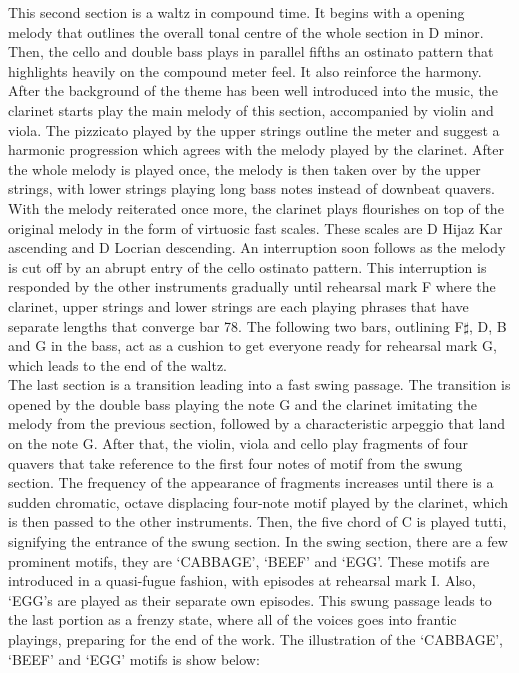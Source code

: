 \documentclass{article}
\begin{document}
This second section is a waltz in compound time. It begins with a opening
melody that outlines the overall tonal centre of the whole section in D minor.
Then, the cello
and double bass plays in parallel fifths an ostinato pattern that highlights
heavily on the compound meter feel. It also reinforce the harmony. After the
background of the theme has been well introduced into the music, the clarinet
starts play the main melody of this section, accompanied by violin and viola.
The pizzicato played by the upper strings outline the meter and suggest a
harmonic progression which agrees with the melody played by the clarinet. After
the whole melody is played once, the melody is then taken over by the upper
strings, with lower strings playing long bass notes instead of downbeat
quavers. With the melody reiterated once more, the clarinet plays flourishes on
top of the original melody in the form of virtuosic fast scales. These scales
are D Hijaz Kar ascending and D Locrian descending. An interruption soon
follows as the melody is cut off by an abrupt entry of the cello ostinato
pattern. This interruption is responded by the other instruments gradually
until rehearsal mark F where the clarinet, upper strings and lower strings are
each playing phrases that have separate lengths that converge bar 78. The
following two bars, outlining F\(\sharp\), D, B and G in the bass, act as a
cushion to get everyone ready for rehearsal mark G, which leads to the end of
the waltz.\\

The last section is a transition leading into a fast swing passage.
The transition is opened by the double bass playing the note G and the clarinet
imitating the melody from the previous section, followed by a characteristic
arpeggio that land on the note G. After that, the violin, viola and cello play
fragments of four quavers that take reference to the first four notes of motif
from the swung section.  The frequency of the appearance of fragments increases
until there is a sudden chromatic, octave displacing four-note motif played by
the clarinet, which is then passed to the other instruments. Then, the five
chord of C is played tutti, signifying the entrance of the swung section. In
the swing section, there are a few prominent motifs, they are `CABBAGE',
`BEEF' and `EGG'. These motifs are introduced in a quasi-fugue fashion, with
episodes at rehearsal mark I. Also, `EGG's are played as their separate own
episodes. This swung passage leads to the last portion as a frenzy state,
where all of the voices goes into frantic playings, preparing for the end of
the work. The illustration of the `CABBAGE', `BEEF' and `EGG' motifs is show
below:
\end{document}
